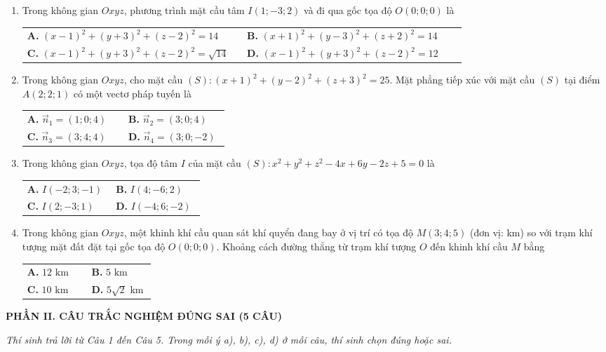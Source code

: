 \documentclass[12pt,a4paper]{article}
\makeatletter
\newcommand{\bonpa}[4]{\par\nobreak\smallskip\nobreak\noindent
\begin{tabular}{@{}p{0.48\linewidth}p{0.48\linewidth}@{}}
\textbf{A.} #1 & \textbf{B.} #2\\[8pt]
\textbf{C.} #3 & \textbf{D.} #4\end{tabular}}
\makeatother
\begin{document}
\begin{enumerate}
\item Trong không gian $Oxyz$, phương trình mặt cầu tâm $I(1; -3; 2)$ và đi qua gốc tọa độ $O(0; 0; 0)$ là
\bonpa{$(x-1)^2 + (y+3)^2 + (z-2)^2 = 14$}{$(x+1)^2 + (y-3)^2 + (z+2)^2 = 14$}{$(x-1)^2 + (y+3)^2 + (z-2)^2 = \sqrt{14}$}{$(x-1)^2 + (y+3)^2 + (z-2)^2 = 12$}

\item Trong không gian $Oxyz$, cho mặt cầu $(S): (x+1)^2 + (y-2)^2 + (z+3)^2 = 25$. Mặt phẳng tiếp xúc với mặt cầu $(S)$ tại điểm $A(2; 2; 1)$ có một vectơ pháp tuyến là
\bonpa{$\vec{n}_1 = (1; 0; 4)$}{$\vec{n}_2 = (3; 0; 4)$}{$\vec{n}_3 = (3; 4; 4)$}{$\vec{n}_4 = (3; 0; -2)$}

\item Trong không gian $Oxyz$, tọa độ tâm $I$ của mặt cầu $(S): x^2 + y^2 + z^2 - 4x + 6y - 2z + 5 = 0$ là
\bonpa{$I(-2; 3; -1)$}{$I(4; -6; 2)$}{$I(2; -3; 1)$}{$I(-4; 6; -2)$}

\item Trong không gian $Oxyz$, một khinh khí cầu quan sát khí quyển đang bay ở vị trí có tọa độ $M(3; 4; 5)$ (đơn vị: km) so với trạm khí tượng mặt đất đặt tại gốc tọa độ $O(0; 0; 0)$. Khoảng cách đường thẳng từ trạm khí tượng $O$ đến khinh khí cầu $M$ bằng
\bonpa{$12\text{ km}$}{$5\text{ km}$}{$10\text{ km}$}{$5\sqrt{2}\text{ km}$}
\end{enumerate}

\newpage
\begin{center}
    {\fontsize{13}{15}\selectfont\textbf{PHẦN II. CÂU TRẮC NGHIỆM ĐÚNG SAI (5 CÂU)}}
\end{center}
\textit{Thí sinh trả lời từ Câu 1 đến Câu 5. Trong mỗi ý a), b), c), d) ở mỗi câu, thí sinh chọn đúng hoặc sai.}

\end{document}
